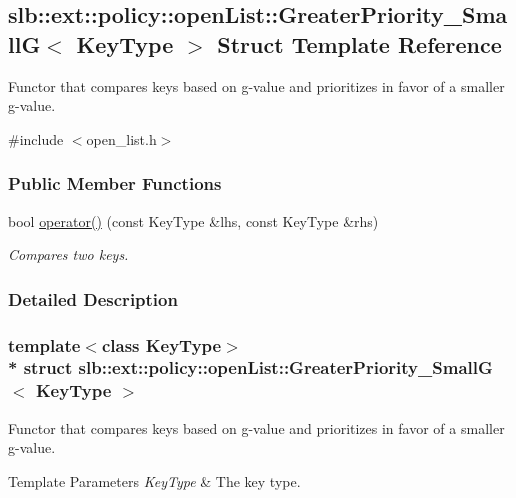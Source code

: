 \hypertarget{structslb_1_1ext_1_1policy_1_1openList_1_1GreaterPriority__SmallG}{}\subsection{slb\+:\+:ext\+:\+:policy\+:\+:open\+List\+:\+:Greater\+Priority\+\_\+\+SmallG$<$ Key\+Type $>$ Struct Template Reference}
\label{structslb_1_1ext_1_1policy_1_1openList_1_1GreaterPriority__SmallG}


Functor that compares keys based on g-\/value and prioritizes in favor of a smaller g-\/value.  




{\ttfamily \#include $<$open\+\_\+list.\+h$>$}

\subsubsection*{Public Member Functions}
\begin{DoxyCompactItemize}
\item 
bool \hyperlink{structslb_1_1ext_1_1policy_1_1openList_1_1GreaterPriority__SmallG_a5bfd65b87aff6817a1294a5ec488f115}{operator()} (const Key\+Type \&lhs, const Key\+Type \&rhs)
\begin{DoxyCompactList}\small\item\em Compares two keys. \end{DoxyCompactList}\end{DoxyCompactItemize}


\subsubsection{Detailed Description}
\subsubsection*{template$<$class Key\+Type$>$\\*
struct slb\+::ext\+::policy\+::open\+List\+::\+Greater\+Priority\+\_\+\+Small\+G$<$ Key\+Type $>$}

Functor that compares keys based on g-\/value and prioritizes in favor of a smaller g-\/value. 


\begin{DoxyTemplParams}{Template Parameters}
{\em Key\+Type} & The key type. \\
\hline
\end{DoxyTemplParams}


